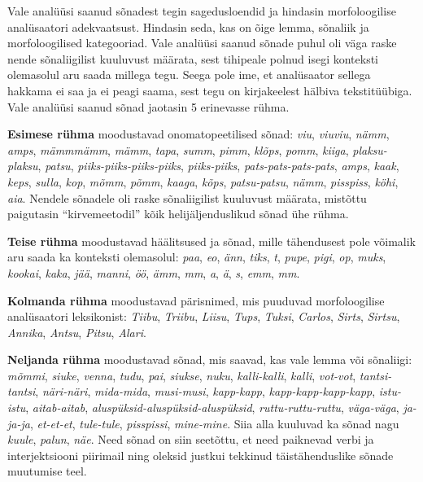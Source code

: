 \documentclass[12pt]{article}
\begin{document}
Vale analüüsi saanud sõnadest tegin sagedusloendid ja hindasin morfoloogilise analüsaatori adekvaatsust. Hindasin seda, kas on õige lemma, sõnaliik ja morfoloogilised kategooriad. Vale analüüsi saanud sõnade puhul oli väga raske nende sõnaliigilist kuuluvust määrata, sest tihipeale polnud isegi konteksti olemasolul aru saada millega tegu. Seega pole ime, et analüsaator sellega hakkama ei saa ja ei peagi saama, sest tegu on kirjakeelest hälbiva tekstitüübiga. Vale analüüsi saanud sõnad jaotasin 5 erinevasse rühma.

\textbf{Esimese rühma} moodustavad onomatopeetilised sõnad: \emph{viu}, \emph{viuviu}, \emph{nämm}, \emph{amps}, \emph{mämmmämm}, \emph{mämm}, \emph{tapa}, \emph{summ}, \emph{pimm}, \emph{klõps}, \emph{pomm}, \emph{kiiga}, \emph{plaksu-plaksu}, \emph{patsu}, \emph{piiks-piiks-piiks-piiks}, \emph{piiks-piiks}, \emph{pats-pats-pats-pats}, \emph{amps}, \emph{kaak}, \emph{keps}, \emph{sulla}, \emph{kop}, \emph{mõmm}, \emph{põmm}, \emph{kaaga}, \emph{kõps}, \emph{patsu-patsu}, \emph{nämm}, \emph{pisspiss}, \emph{köhi}, \emph{aia}. Nendele sõnadele oli raske sõnaliigilist kuuluvust määrata, mistõttu paigutasin ``kirvemeetodil'' kõik helijäljenduslikud sõnad ühe rühma.


\textbf{Teise rühma} moodustavad häälitsused ja sõnad, mille tähendusest pole võimalik aru saada ka konteksti olemasolul: \emph{paa}, \emph{eo}, \emph{änn}, \emph{tiks}, \emph{t}, \emph{pupe}, \emph{pigi}, \emph{op}, \emph{muks}, \emph{kookai}, \emph{kaka}, \emph{jää}, \emph{manni}, \emph{öö}, \emph{ämm}, \emph{mm}, \emph{a}, \emph{ä}, \emph{s}, \emph{emm}, \emph{mm}.

\textbf{Kolmanda rühma} moodustavad pärisnimed, mis puuduvad morfoloogilise analüsaatori leksikonist: \emph{Tiibu}, \emph{Triibu}, \emph{Liisu}, \emph{Tups}, \emph{Tuksi}, \emph{Carlos}, \emph{Sirts}, \emph{Sirtsu}, \emph{Annika}, \emph{Antsu}, \emph{Pitsu}, \emph{Alari}.

\textbf{Neljanda rühma} moodustavad sõnad, mis saavad, kas vale lemma või sõnaliigi: 
\emph{mõmmi}, \emph{siuke}, \emph{venna}, \emph{tudu}, \emph{pai}, \emph{siukse}, \emph{nuku}, \emph{kalli-kalli}, \emph{kalli}, \emph{vot-vot}, \emph{tantsi-tantsi}, \emph{näri-näri}, \emph{mida-mida}, \emph{musi-musi}, \emph{kapp-kapp}, \emph{kapp-kapp-kapp-kapp}, \emph{istu-istu}, \emph{aitab-aitab}, \emph{aluspüksid-aluspüksid-aluspüksid}, \emph{ruttu-ruttu-ruttu}, \emph{väga-väga}, \emph{ja-ja-ja}, \emph{et-et-et}, \emph{tule-tule}, \emph{pisspissi}, \emph{mine-mine}. Siia alla kuuluvad ka sõnad nagu \emph{kuule}, \emph{palun}, \emph{näe}. Need sõnad on siin seetõttu, et need paiknevad verbi ja interjektsiooni piirimail ning oleksid justkui tekkinud täistähenduslike sõnade muutumise teel. 
\end{document}
